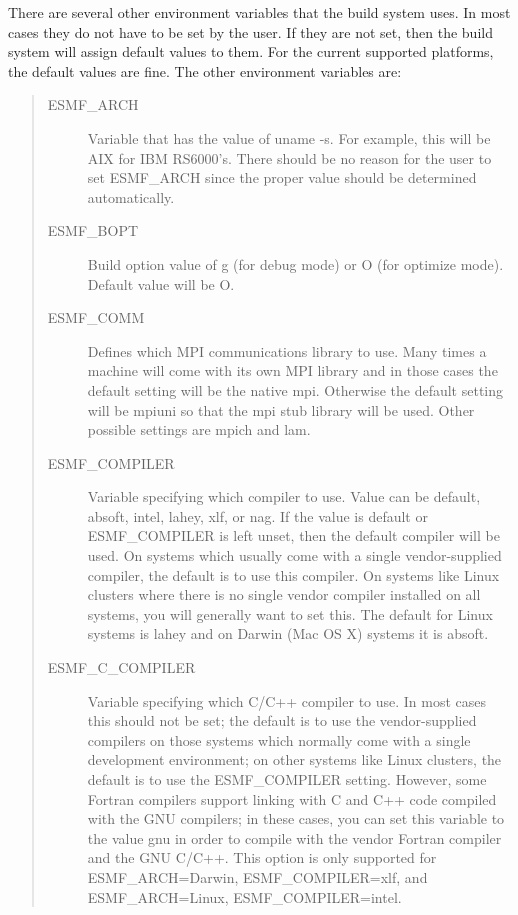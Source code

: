 There are several other environment variables that the build system uses.
In most cases they do not have to be set by the user.  If they are not
set, then the build system will assign default values to them.  For the
current supported platforms, the default values are fine.  The other
environment variables are:
\begin{quote}
\begin{description}

  \item[ESMF\_ARCH] Variable that has the value of uname -s.  
                 For example, this will be AIX for IBM
                 RS6000's.  There should be no reason for the
                 user to set ESMF\_ARCH since the proper value should be
                 determined automatically.

  \item[ESMF\_BOPT] Build option value of g (for debug mode) or O (for
                 optimize mode).  Default value will be O.

  \item[ESMF\_COMM] Defines which MPI communications library to use.  
                 Many times a machine will come with its own MPI 
                 library and in those cases the default setting 
                 will be the native mpi.  Otherwise the default setting 
                 will be mpiuni so that the mpi stub library will be used.
                 Other possible settings are mpich and lam.

\item[ESMF\_COMPILER]

Variable specifying which compiler to use.  Value can be default,
absoft, intel, lahey, xlf, or nag.  If the value is default or
ESMF\_COMPILER is left unset, then the default compiler will be
used. On systems which usually come with a single vendor-supplied
compiler, the default is to use this compiler.  On systems like
Linux clusters where there is no single vendor compiler installed
on all systems, you will generally want to set this.
The default for Linux systems is lahey and on Darwin (Mac OS X)
systems it is absoft.

\item[ESMF\_C\_COMPILER]

Variable specifying which C/C++ compiler to use.   In most cases
this should not be set; the default is to use the vendor-supplied
compilers on those systems which normally come with a single
development environment; on other systems like Linux clusters,
the default is to use the ESMF\_COMPILER setting.  However, some
Fortran compilers support linking with C and C++ code compiled
with the GNU compilers; in these cases, you can set this variable
to the value gnu in order to compile with the vendor Fortran
compiler and the GNU C/C++.   This option is only supported for
ESMF\_ARCH=Darwin, ESMF\_COMPILER=xlf, and ESMF\_ARCH=Linux,
ESMF\_COMPILER=intel.


\end{description}
\end{quote}
